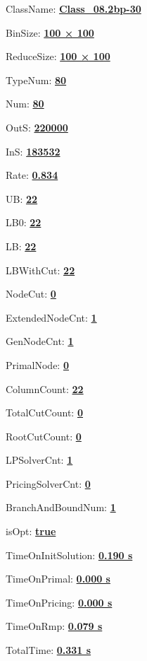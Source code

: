 \documentclass[11pt]{article}
\begin{document}
\pagestyle{empty}


ClassName: \underline{\textbf{Class_08.2bp-30}}
\par
BinSize: \underline{\textbf{100 × 100}}
\par
ReduceSize: \underline{\textbf{100 × 100}}
\par
TypeNum: \underline{\textbf{80}}
\par
Num: \underline{\textbf{80}}
\par
OutS: \underline{\textbf{220000}}
\par
InS: \underline{\textbf{183532}}
\par
Rate: \underline{\textbf{0.834}}
\par
UB: \underline{\textbf{22}}
\par
LB0: \underline{\textbf{22}}
\par
LB: \underline{\textbf{22}}
\par
LBWithCut: \underline{\textbf{22}}
\par
NodeCut: \underline{\textbf{0}}
\par
ExtendedNodeCnt: \underline{\textbf{1}}
\par
GenNodeCnt: \underline{\textbf{1}}
\par
PrimalNode: \underline{\textbf{0}}
\par
ColumnCount: \underline{\textbf{22}}
\par
TotalCutCount: \underline{\textbf{0}}
\par
RootCutCount: \underline{\textbf{0}}
\par
LPSolverCnt: \underline{\textbf{1}}
\par
PricingSolverCnt: \underline{\textbf{0}}
\par
BranchAndBoundNum: \underline{\textbf{1}}
\par
isOpt: \underline{\textbf{true}}
\par
TimeOnInitSolution: \underline{\textbf{0.190 s}}
\par
TimeOnPrimal: \underline{\textbf{0.000 s}}
\par
TimeOnPricing: \underline{\textbf{0.000 s}}
\par
TimeOnRmp: \underline{\textbf{0.079 s}}
\par
TotalTime: \underline{\textbf{0.331 s}}
\par
\newpage


\end{document}
